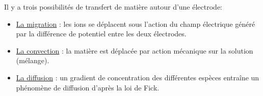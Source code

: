 \documentclass[a4paper]{article}
\begin{document}
\pagestyle{fancy}
\fancyhf{}
\setlength{\headheight}{15pt}

\begin{center}
	\large{}
\end{center}


Il y a trois possibilités de transfert de matière autour d'une électrode:\begin{itemize}
\item
\underline{La migration} : les ions se déplacent sous l'action du champ électrique généré par la différence de potentiel entre les deux électrodes.
\item
\underline{La convection} : la matière est déplacée par action mécanique sur la solution (mélange).
\item
\underline{La diffusion} : un gradient de concentration des différentes espèces entraîne un phénomène de diffusion d'après la loi de Fick.
\end{itemize}
\end{document}
